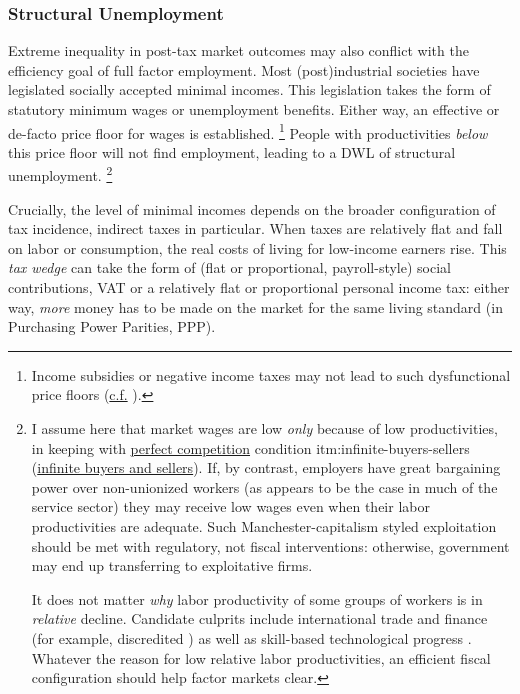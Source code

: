 \subsubsection{Structural Unemployment}
	\label{sec:StructuralUnemployment}
Extreme inequality in post-tax market outcomes may also conflict with the efficiency goal of full factor employment.
Most (post)industrial societies have legislated socially accepted minimal incomes.
This legislation takes the form of statutory minimum wages or unemployment benefits.
Either way, an effective or de-facto price floor for wages is established.
\footnote{
	Income subsidies or negative income taxes may not lead to such dysfunctional price floors (\href{http://maxheld.de/2010/04/19/sharing-the-burden/}{c.f.} \citealt{Held2010}).
}
People with productivities \emph{below} this price floor will not find employment, leading to a DWL of structural unemployment.
\footnote{
	I assume here that market wages are low \emph{only} because of low productivities, in keeping with \hyperref[sec:perfect-competition]{perfect competition} condition {itm:infinite-buyers-sellers} (\hyperref[itm:infinite-buyers-sellers]{infinite buyers and sellers}).
	If, by contrast, employers have great bargaining power over non-unionized workers (as appears to be the case in much of the service sector) they may receive low wages even when their labor productivities are adequate.
	Such Manchester-capitalism styled exploitation should be met with regulatory, not fiscal interventions:
	otherwise, government may end up transferring to exploitative firms.

	It does not matter \emph{why} labor productivity of some groups of workers is in \emph{relative} decline.
	Candidate culprits include international trade and finance (for example, discredited \citealt{Stolper1941}) as well as skill-based technological progress \citep{Card2001}.
	Whatever the reason for low relative labor productivities, an efficient fiscal configuration should help factor markets clear.
}

Crucially, the level of minimal incomes depends on the broader configuration of tax incidence, indirect taxes in particular.
When taxes are relatively flat and fall on labor or consumption, the real costs of living for low-income earners rise.
This \emph{tax wedge} can take the form of (flat or proportional, payroll-style) social contributions, VAT or a relatively flat or proportional personal income tax:
either way, \emph{more} money has to be made on the market for the same living standard (in Purchasing Power Parities, PPP).


